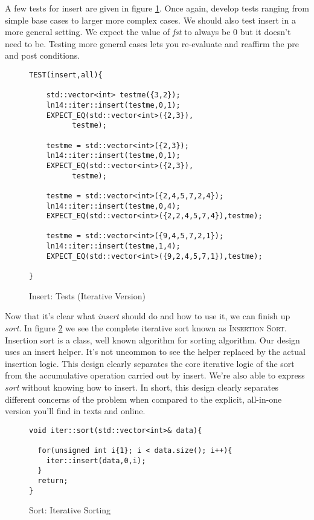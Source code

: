 \documentclass[]{tufte-handout}
\begin{document}
A few tests for insert are given in figure \ref{code:insertitertests}. 	Once again, develop tests ranging from simple base cases to larger more complex cases. We should also test insert in a more general setting. We expect the value of \textit{fst} to always be 0 but it doesn't need to be. Testing more general cases lets you re-evaluate and reaffirm the pre and post conditions. 
\begin{figure}
\begin{lstlisting}
TEST(insert,all){

    std::vector<int> testme({3,2});
    ln14::iter::insert(testme,0,1);
    EXPECT_EQ(std::vector<int>({2,3}),
	      testme);

    testme = std::vector<int>({2,3});
    ln14::iter::insert(testme,0,1);
    EXPECT_EQ(std::vector<int>({2,3}),
	      testme);
   
    testme = std::vector<int>({2,4,5,7,2,4});
    ln14::iter::insert(testme,0,4);
    EXPECT_EQ(std::vector<int>({2,2,4,5,7,4}),testme);

    testme = std::vector<int>({9,4,5,7,2,1});
    ln14::iter::insert(testme,1,4);
    EXPECT_EQ(std::vector<int>({9,2,4,5,7,1}),testme);
    
}
\end{lstlisting}
\label{code:insertitertests}
\caption{Insert: Tests (Iterative Version)}
\end{figure}

Now that it's clear what \textit{insert} should do and how to use it, we can finish up \textit{sort}. In figure \ref{code:sortiter} we see the complete iterative sort known as \textsc{Insertion Sort}. Insertion sort is a class, well known algorithm for sorting algorithm. Our design uses an insert helper. It's not uncommon to see the helper replaced by the actual insertion logic. This design clearly separates the core iterative logic of the sort from the accumulative operation carried out by insert. We're also able to express \textit{sort} without knowing how to insert. In short, this design clearly separates different concerns of the problem when compared to the explicit, all-in-one version you'll find in texts and online. 

\begin{figure}[htbp!]
\begin{lstlisting}
void iter::sort(std::vector<int>& data){

  for(unsigned int i{1}; i < data.size(); i++){
    iter::insert(data,0,i);
  }
  return;
}
\end{lstlisting}
\label{code:sortiter}
\caption{Sort: Iterative Sorting}
\end{figure}
\end{document}
